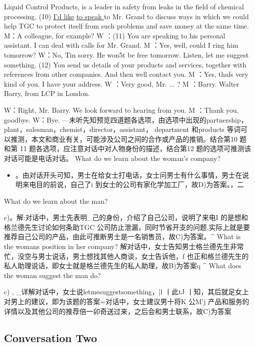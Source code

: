 \documentclass[UTF8,11pt]{ctexart}
\begin{document}
Liquid Control Products, is a leader in safety from leaks in the field of chemical processing. (10) \uline{I’d like} \uline{to speak }to Mr. Grand to discuss ways in which we could help TGC to protect itself from such problems and save money at the same time. M：A colleague, for example? W ：(11) You are speaking to his personal assistant. I can deal with calls for Mr. Grand. M ：Yes, well, could I ring him tomorrow? W：No, Tin sorry. He won5t be free tomorrow. Listen, let me suggest something. (12) You send us details of your products and services, together with references from other companies. And then well contact you. M ：Yes, thafs very kind of you. I have your address. W ：Very good, Mr. ... ? M ：Barry. Walter Barry, from LCP in London.


W：Right, Mr. Barry. We look forward to hearing from you. M ：Thank you, goodbye. W：Bye. —未听先知预览四道题各选项，由选项中出现的partnership，plant，salesman，chemist，director，assistant， department 和products 等词可以推测，本文和商业有关，可能涉及公司之间的合作或产品的推销。结合第10 题和第 11 题各选项，应注意对话中对人物身份的描述，结合第12 题的选项可推测该对话可能是电话对话。 What do we learn about the woman’s company?


\begin{itemize}[leftmargin=2em,itemsep=.2em,topsep=.4em]\item[D.] 。由对话开头可知，男士在给女士打电话，女士问男士有什么事情，男士在说明来电目的前说，自己了i 到女士的公司有家化学加工厂，故D)为答案。，二
\end{itemize}

What do we learn about the man?


c)。解:对话中，男士先表明\_己的身份，介绍了自己公司，说明了来电I 的是想和格兰德先生讨论如何条助TGC 公司防止泄漏，同时节省开支的问题,实际上就是要推荐自己公司的产品，由此可推断男士是一名销售员，故C)为答案。\textasciicircum{} What is the womans position in her company? 解对话中，女士告知男士格兰德先生非常忙，没空与男士说话，男士想找其他人商谈，女士告诉他，f 也正和格兰德先生的私人助理说话，即女士就是格兰德先生的私人助理，故B)为答案q \textasciicircum{} What does the woman suggest the man do?


c) , \_详解对话中，女士说letmesuggestsomething，|l 丨此tJ 丨知，其后就足女上对男上的建议，即为该题的答案=对话中，女士建议男十将K 公M'j 产品和服务的详情以及其他公司的推荐倍一卯奇送过来，之后会和男士联系，故C)为答案


\subsection*{Conversation Two}
\end{document}
